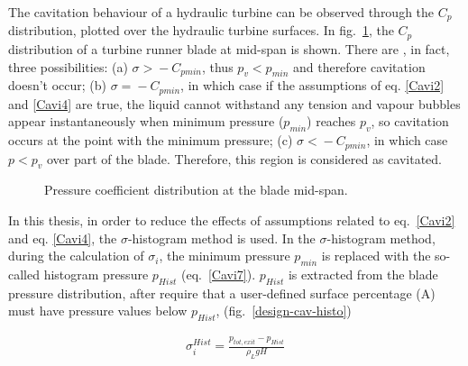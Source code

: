 The cavitation behaviour of a hydraulic turbine can be observed through the $C_p$ distribution, plotted over the hydraulic turbine surfaces.  In fig.\ \ref{design-cav-cp}, the $C_p$ distribution of a turbine runner blade at mid-span is shown. There are , in fact, three possibilities: (a) $\sigma\!>\!-C_{pmin}$, thus $p_v\!<\!p_{min}$ and therefore cavitation doesn't occur; (b)  $\sigma\!=\!-C_{pmin}$, in which case if the assumptions of eq. \ref{Cavi2} and \ref{Cavi4} are true, the liquid cannot withstand any tension and vapour bubbles appear instantaneously when minimum pressure ($p_{min}$) reaches $p_{v}$, so cavitation occurs at the point with the minimum pressure; (c) $\sigma\!<\!-C_{pmin}$, in which case $p\!<\!p_v$ over  part of the blade. Therefore, this region is considered as cavitated.     

\begin{figure}[h!]
\begin{minipage}[b]{1\linewidth}
 \centering
\end{minipage}
\caption{Pressure coefficient distribution at the blade mid-span.}
\label{design-cav-cp}
\end{figure}

In this thesis, in order to reduce the effects of assumptions related to eq.\ \ref{Cavi2} and eq. \ref{Cavi4}, the $\sigma$-histogram method \cite{Schmidl} is used. In the $\sigma$-histogram method, during the calculation of $\sigma_i$, the minimum pressure $p_{min}$ is replaced with the  so-called histogram pressure $p_{Hist}$ (eq.\ \ref{Cavi7}). $p_{Hist}$ is extracted from the blade pressure distribution, after require that a user-defined surface percentage (A) must have pressure values below $p_{Hist}$, (fig.\ \ref{design-cav-histo})  

\begin{eqnarray}
		\sigma_i^{Hist}=\frac{p_{tot,exit}-p_{Hist}}{\rho_{L}gH}
\label{Cavi7}
\end{eqnarray}

